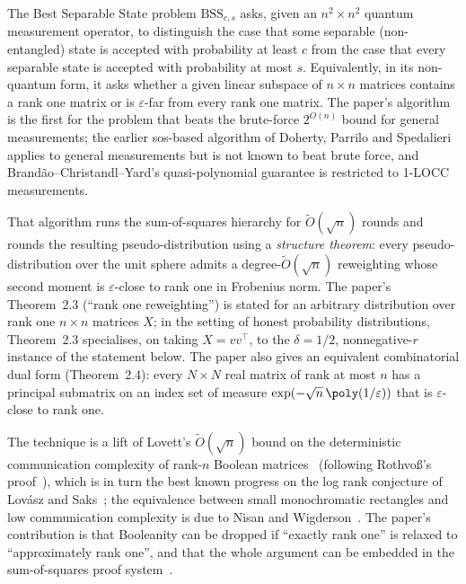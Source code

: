 \documentclass{conjura-conjecture}
\newcommand{\Ot}{\tilde{O}}
\newcommand{\BSS}{\mathrm{BSS}}
\begin{document}
The Best Separable State problem $\BSS_{c,s}$ asks, given an $n^{2}
\times n^{2}$ quantum measurement operator, to distinguish the case
that some separable (non-entangled) state is accepted with probability
at least $c$ from the case that every separable state is accepted with
probability at most $s$. Equivalently, in its non-quantum form, it
asks whether a given linear subspace of $n \times n$ matrices contains
a rank one matrix or is $\varepsilon$-far from every rank one matrix.
The paper's algorithm is the first for the problem that beats the
brute-force $2^{O(n)}$ bound for general measurements; the earlier
sos-based algorithm of Doherty, Parrilo and Spedalieri applies to
general measurements but is not known to beat brute force, and
Brand\~{a}o--Christandl--Yard's quasi-polynomial guarantee is
restricted to 1-LOCC measurements.

That algorithm runs the sum-of-squares hierarchy for $\Ot(\sqrt{n})$
rounds and rounds the resulting pseudo-distribution using a
\emph{structure theorem}: every pseudo-distribution over the unit
sphere admits a degree-$\Ot(\sqrt{n})$ reweighting whose second moment
is $\varepsilon$-close to rank one in Frobenius norm. The paper's
Theorem~2.3 (``rank one reweighting'') is stated for an arbitrary
distribution over rank one $n \times n$ matrices $X$; in the setting
of honest probability distributions, Theorem~2.3 specialises, on
taking $X = vv^{\top}$, to the $\delta = 1/2$, nonnegative-$r$
instance of the statement below. The paper also gives an equivalent
combinatorial dual form (Theorem~2.4): every $N \times N$ real matrix
of rank at most $n$ has a principal submatrix on an index set of
measure $\exp(-\sqrt{n}\,\poly(1/\varepsilon))$ that is
$\varepsilon$-close to rank one.

The technique is a lift of Lovett's $\Ot(\sqrt{n})$ bound on the
deterministic communication complexity of rank-$n$ Boolean
matrices~\cite{Lov14} (following Rothvo{\ss}'s proof~\cite{Rot14}),
which is in turn the best known progress on the log rank conjecture of
Lov\'{a}sz and Saks~\cite{LS88}; the equivalence between small
monochromatic rectangles and low communication complexity is due to
Nisan and Wigderson~\cite{NW94}. The paper's contribution is that
Booleanity can be dropped if ``exactly rank one'' is relaxed to
``approximately rank one'', and that the whole argument can be
embedded in the sum-of-squares proof system~\cite{BKS16}.
\end{document}
